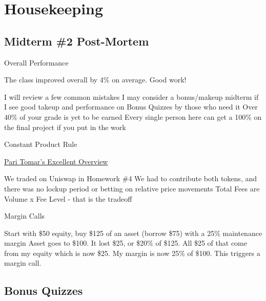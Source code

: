 

\section{Housekeeping}


\subsection{Midterm \#2 Post-Mortem}

\begin{frame}{Overall Performance}

The class improved overall by 4\% on average. Good work! 

\bi 
\m I will review a few common mistakes 
\m I may consider a bonus/makeup midterm if I see good takeup and performance on Bonus Quizzes by those who need it \pause 
\m Over 40\% of your grade is yet to be earned 
\m Every single person here can get a 100\% on the final project if you put in the work 
\ei 
    
\end{frame}

\begin{frame}{Constant Product Rule}

\vfill
\begin{center}
    \href{https://medium.com/@tomarpari90/constant-product-automated-market-maker-everything-you-need-to-know-5bfeb0251ef2}{Pari Tomar's Excellent Overview}
\end{center} \pause 
\vfill
\bi 
\m We traded on Uniswap in Homework \#4 
\m We had to contribute both tokens, and there was no lockup period or betting on relative price movements 
\m Total Fees are Volume x Fee Level - that is the tradeoff 
\ei 
    
\end{frame}


\begin{frame}{Margin Calls}

\bi 
\m Start with \$50 equity, buy \$125 of an asset (borrow \$75) with a 25\% maintenance margin 
\pause 
\m Asset goes to \$100. It lost \$25, or \$20\% of \$125. 
\pause
\m All \$25 of that come from my equity which is now \$25. My margin is now 25\% of \$100. 
\m This triggers a margin call. 
\ei 
    
\end{frame}



\subsection{Bonus Quizzes}

